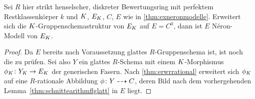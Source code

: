 \documentclass[german]{scrreprt}
\begin{document}
\begin{Satz}\label{thm:fallstriktehenselisierung}
  Sei $R$ hier strikt henselscher, diskreter Bewertungsring mit
  perfektem Restklassenkörper $k$
  und $K$, $E_{K}$, $C$, $E$ wie in \ref{thm:exneronmodelle}.
  Erweitert sich die $K$-Gruppenschemastruktur von $E_{K}$ auf
  $E=C^0$, dann ist $E$ Néron-Modell von $E_{K}$.
  \begin{proof}
    Da $E$ bereits nach Voraussetzung glattes $R$-Gruppenschema ist,
    ist noch die \NAbbEig zu prüfen.
    Sei also $Y$ ein glattes $R$-Schema mit einem $K$-Morphismus
    $\phi_{K}\colon Y_{K}\to E_{K}$ der generischen Fasern.
    Nach \ref{thm:erwrrational} erweitert sich $\phi_{K}$ auf eine
    $R$-rationale Abbildung $\phi\colon Y\dashrightarrow C$, deren Bild nach dem
    vorhergehenden Lemma~\ref{thm:schnittearithmflglatt} in $E$
    liegt.
    

\end{proof}
\end{Satz}
\end{document}
